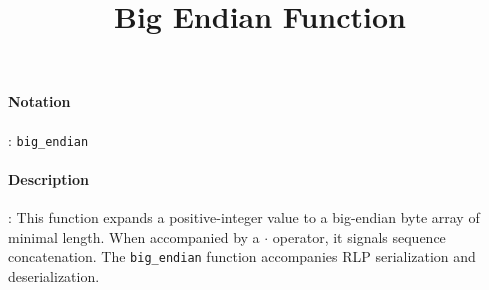 \documentclass[10pt,a4paper,oneside]{scrartcl}
\author{}
\title{Big Endian Function}
\date{}
\begin{document}
\maketitle

\begin{paracol}{3}

\paragraph{Notation}: \texttt{big\_endian}
	\paragraph{Description}: This function expands a positive-integer value to a big-endian byte  array of minimal length. \switchcolumn When accompanied by a $\cdot$ operator, it signals sequence concatenation. \switchcolumn The \texttt{big\_endian} function  accompanies RLP serialization and deserialization.
\end{paracol}
\end{document}
